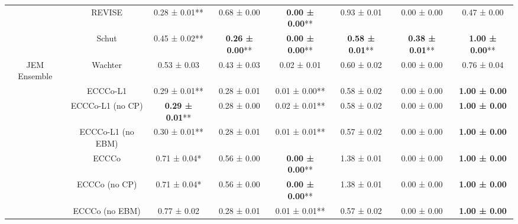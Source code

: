 \begin{table}
{\begin{tabular}[t]{cccccccc}
 & REVISE & 0.28 ± 0.01** & 0.68 ± 0.00\hphantom{*}\hphantom{*} & \textbf{0.00 ± 0.00}** & 0.93 ± 0.01\hphantom{*}\hphantom{*} & 0.00 ± 0.00\hphantom{*}\hphantom{*} & 0.47 ± 0.00\hphantom{*}\hphantom{*}\\

 & Schut & 0.45 ± 0.02** & \textbf{0.26 ± 0.00}** & \textbf{0.00 ± 0.00}** & \textbf{0.58 ± 0.01}** & \textbf{0.38 ± 0.01}** & \textbf{1.00 ± 0.00}**\\

\multirow[t]{-9}{*}{\centering\arraybackslash JEM Ensemble} & Wachter & 0.53 ± 0.03\hphantom{*}\hphantom{*} & 0.43 ± 0.03\hphantom{*}\hphantom{*} & 0.02 ± 0.01\hphantom{*}\hphantom{*} & 0.60 ± 0.02\hphantom{*}\hphantom{*} & 0.00 ± 0.00\hphantom{*}\hphantom{*} & 0.76 ± 0.04\hphantom{*}\hphantom{*}\\
\cmidrule{1-8}
 & ECCCo-L1 & 0.29 ± 0.01** & 0.28 ± 0.01\hphantom{*}\hphantom{*} & 0.01 ± 0.00** & 0.58 ± 0.02\hphantom{*}\hphantom{*} & 0.00 ± 0.00\hphantom{*}\hphantom{*} & \textbf{1.00 ± 0.00}\hphantom{*}\hphantom{*}\\

 & ECCCo-L1 (no CP) & \textbf{0.29 ± 0.01}** & 0.28 ± 0.00\hphantom{*}\hphantom{*} & 0.02 ± 0.01** & 0.58 ± 0.02\hphantom{*}\hphantom{*} & 0.00 ± 0.00\hphantom{*}\hphantom{*} & \textbf{1.00 ± 0.00}\hphantom{*}\hphantom{*}\\

 & ECCCo-L1 (no EBM) & 0.30 ± 0.01** & 0.28 ± 0.01\hphantom{*}\hphantom{*} & 0.01 ± 0.01** & 0.57 ± 0.02\hphantom{*}\hphantom{*} & 0.00 ± 0.00\hphantom{*}\hphantom{*} & \textbf{1.00 ± 0.00}\hphantom{*}\hphantom{*}\\

 & ECCCo & 0.71 ± 0.04*\hphantom{*} & 0.56 ± 0.00\hphantom{*}\hphantom{*} & \textbf{0.00 ± 0.00}** & 1.38 ± 0.01\hphantom{*}\hphantom{*} & 0.00 ± 0.00\hphantom{*}\hphantom{*} & \textbf{1.00 ± 0.00}\hphantom{*}\hphantom{*}\\

 & ECCCo (no CP) & 0.71 ± 0.04*\hphantom{*} & 0.56 ± 0.00\hphantom{*}\hphantom{*} & \textbf{0.00 ± 0.00}** & 1.38 ± 0.01\hphantom{*}\hphantom{*} & 0.00 ± 0.00\hphantom{*}\hphantom{*} & \textbf{1.00 ± 0.00}\hphantom{*}\hphantom{*}\\

 & ECCCo (no EBM) & 0.77 ± 0.02\hphantom{*}\hphantom{*} & 0.28 ± 0.01\hphantom{*}\hphantom{*} & 0.01 ± 0.01** & 0.57 ± 0.02\hphantom{*}\hphantom{*} & 0.00 ± 0.00\hphantom{*}\hphantom{*} & \textbf{1.00 ± 0.00}\hphantom{*}\hphantom{*}\\


\end{tabular}}
\end{table}
